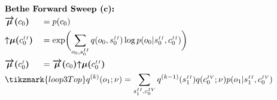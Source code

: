 \documentclass[fleqn]{article}
\begin{document}
\noindent
\begin{alignat}{2}
     & \rlap{\text{\bfseries Bethe Forward Sweep (c):}} \nonumber                                                                                                                                                                                                                                                                                                                                                                                                                                                                   \\
     & \bm{\overrightarrow{\mu}(}c_0\bm{)}                                                                                                                                                                                                                                                                                                                &  & = p(c_0)                                                                                                                                                             \\
     & \bm{{\uparrow}{\mu}(}c^{\scriptscriptstyle II}_0\bm{)}                                                                                                                                                                                                                                                                                             &  & = \exp \biggl( \sum_{o_0,s^{\scriptscriptstyle II}_0} q(o_0,s^{\scriptscriptstyle II}_0) \log p(o_0|s^{\scriptscriptstyle II}_0,c^{\scriptscriptstyle II}_0) \biggr) \\
     & \bm{\overrightarrow{\mu}(}c^{\scriptscriptstyle I}_0\bm{)}                                                                                                                                                                                                                                                                                         &  & = \bm{\overrightarrow{\mu}(}c_0\bm{)} \bm{{\uparrow}{\mu}(}c^{\scriptscriptstyle II}_0\bm{)}                                                                         \\
     & \mathrlap{\begin{aligned}[t]
               \tikzmark{loop3Top} q^{(k)}(o_1; \nu)                         & = \sum_{s^{\scriptscriptstyle II}_1,c^{\scriptscriptstyle IV}_0} q^{(k-1)}(s^{\scriptscriptstyle II}_1) q(c^{\scriptscriptstyle IV}_0; \nu) p(o_1|s^{\scriptscriptstyle II}_1,c^{\scriptscriptstyle IV}_0)                                                              \\

\end{aligned}}
\end{alignat}
\end{document}
